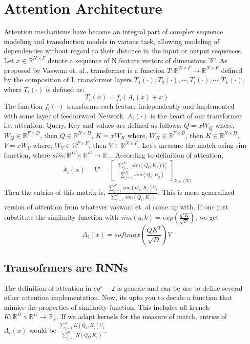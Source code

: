 \documentclass{article}
\newcommand{\R}{\mathbb{R}}
\begin{document}
\section{Attention Architecture}
    Attention mechanisms have become an integral part of complex sequence modeling and transduction models in various task, allowing modeling of dependencies without regard to their distance in the input or output sequences.
    Let $x \in \R^{N \times F}$ denote a sequence of N feature vectors of dimensions 'F'. As proposed by Vaswani et. al., transformer is a function $T: \R^{N \times F} \rightarrow \R^{N \times F}$ defined by the composition of L transformer layers $T_1(\cdot),T_2(\cdot),\cdots,T_i(\cdot),\cdots,T_L(\cdot)$, where $T_i(\cdot)$
    is defined as:
    \begin{equation}
        T_i(x)=f_i(A_i(x)+x)
    \end{equation}
    The function $f_i(\cdot)$ transforms each feature independently and implemented with some layer of feedforward Network. $A_i(\cdot)$ is the heart of our transformer i.e. attention. 
    Query, Key and values are defined as follows:
    $Q=xW_Q$  where, $W_Q \in \R^{F \times D}$, then $Q \in \R^{N \times D}$, $K=xW_K$  where, $W_K \in \R^{F \times D}$, then $K \in \R^{N \times D}$, $V=xW_V$  where, $W_V \in \R^{F \times F}$, then $V \in \R^{N \times F}$.
    Let's measure the match using sim function, where $sim: \R^D \times \R^D \rightarrow \R_+$.
    According to definition of attention,
    \begin{equation}
        A_i(x)=V'=\begin{bmatrix}
            \frac{\sum_{j=1}^{N}sim(Q_k,K_j)V_j}{\sum_{j=1}^{N}sim(Q_k,K_j)}
        \end{bmatrix}_{k \in \{N\}}
    \end{equation}
    Then the entries of this matrix is, $ \frac{\sum_{j=1}^{N}sim(Q_k,K_j)V_j}{\sum_{j=1}^{N}sim(Q_k,K_j)}.$ This is more generalized version of attention from whatever vaswani et. al came up with. If one just substitute the similarity function with $sim(q,k)=exp(\frac{q^TK}{\sqrt{D}})$, we get
    \begin{equation}
        A_i(x)=softmax(\frac{QK^T}{\sqrt{D}})V
    \end{equation}
    
\subsection{Transofrmers are RNNs}
The definition of attention in $eq^{n}-2$ is generic and can be use to define several other attention implementation. Now, its upto you to decide a function that mimics the properties of similarity function. This includes all kernels $K: \R^{D} \times \R^{D} \rightarrow \R_+$. If we adapt kernels for the measure of match, entries of $A_i(x)$ would be $
            \frac{\sum_{j=1}^{N}K(Q_k,K_j)V_j}{\sum_{j=1}^{N}K(Q_k,K_j)}$.
       
\end{document}
